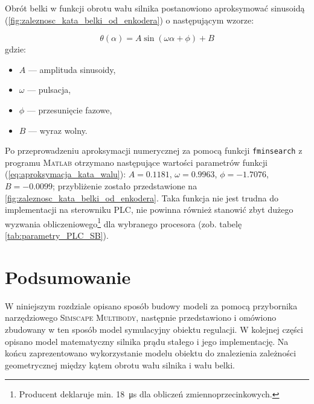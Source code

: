 Obrót belki w funkcji obrotu wału silnika postanowiono aproksymować sinusoidą (\cref{fig:zaleznosc_kata_belki_od_enkodera}) o następującym wzorze:

\begin{equation}\label{eq:aproksymacja_kata_walu}
    \theta(\alpha) = A \sin (\omega \alpha + \phi) + B
\end{equation}
gdzie:
\begin{itemize}
    \item $A$ --- amplituda sinusoidy,
    \item $\omega$ --- pulsacja,
    \item $\phi$ --- przesunięcie fazowe,
    \item $B$ --- wyraz wolny.
\end{itemize}

Po przeprowadzeniu aproksymacji numerycznej za pomocą funkcji \texttt{fminsearch} z programu \textsc{Matlab} otrzymano następujące wartości parametrów funkcji (\ref{eq:aproksymacja_kata_walu}): $A = \num{0.1181}$, $\omega = \num{0.9963}$, $\phi = \num{-1.7076}$, $B = \num{-0.0099}$; przybliżenie zostało przedstawione na \cref{fig:zaleznosc_kata_belki_od_enkodera}. Taka funkcja nie jest trudna do implementacji na sterowniku PLC, nie powinna również stanowić zbyt dużego wyzwania obliczeniowego\footnote{Producent deklaruje min. \SI{18}{\micro\second} dla obliczeń zmiennoprzecinkowych.} dla wybranego procesora (zob. tabelę \ref{tab:parametry_PLC_SB}).

\section{Podsumowanie}

W niniejszym rozdziale opisano sposób budowy modeli za pomocą przybornika narzędziowego \textsc{Simscape Multibody}, następnie przedstawiono i omówiono zbudowany w ten sposób model symulacyjny obiektu regulacji. W kolejnej części opisano model matematyczny silnika prądu stałego i jego implementację. Na końcu zaprezentowano wykorzystanie modelu obiektu do znalezienia zależności geometrycznej między kątem obrotu wału silnika i wału belki.

